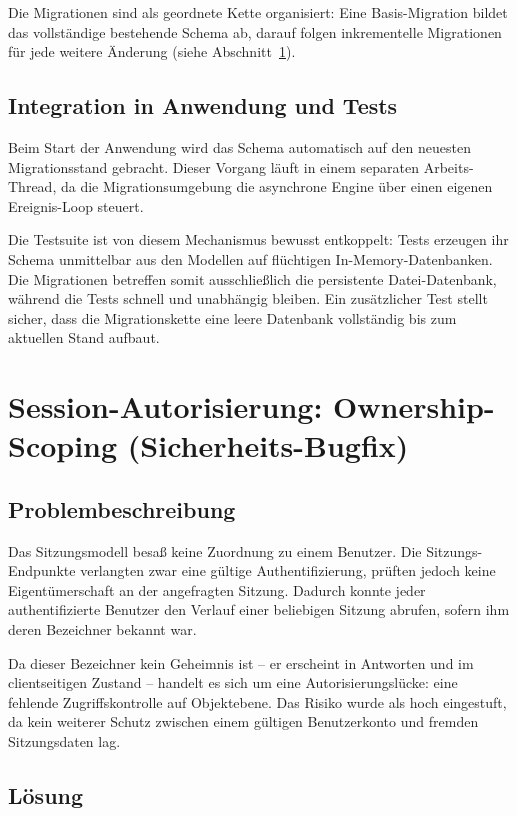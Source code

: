 \documentclass[11pt,a4paper]{article}
\begin{document}
Die Migrationen sind als geordnete Kette organisiert: Eine Basis-Migration bildet das
vollständige bestehende Schema ab, darauf folgen inkrementelle Migrationen für jede
weitere Änderung (siehe Abschnitt~\ref{sec:ownership}).

\subsection{Integration in Anwendung und Tests}

Beim Start der Anwendung wird das Schema automatisch auf den neuesten Migrationsstand
gebracht. Dieser Vorgang läuft in einem separaten Arbeits-Thread, da die
Migrationsumgebung die asynchrone Engine über einen eigenen Ereignis-Loop steuert.

Die Testsuite ist von diesem Mechanismus bewusst entkoppelt: Tests erzeugen ihr Schema
unmittelbar aus den Modellen auf flüchtigen In-Memory-Datenbanken. Die Migrationen
betreffen somit ausschließlich die persistente Datei-Datenbank, während die Tests
schnell und unabhängig bleiben. Ein zusätzlicher Test stellt sicher, dass die
Migrationskette eine leere Datenbank vollständig bis zum aktuellen Stand aufbaut.

\section{Session-Autorisierung: Ownership-Scoping (Sicherheits-Bugfix)}
\label{sec:ownership}

\subsection{Problembeschreibung}

Das Sitzungsmodell besaß keine Zuordnung zu einem Benutzer. Die Sitzungs-Endpunkte
verlangten zwar eine gültige Authentifizierung, prüften jedoch keine Eigentümerschaft
an der angefragten Sitzung. Dadurch konnte jeder authentifizierte Benutzer den Verlauf
einer beliebigen Sitzung abrufen, sofern ihm deren Bezeichner bekannt war.

Da dieser Bezeichner kein Geheimnis ist -- er erscheint in Antworten und im
clientseitigen Zustand -- handelt es sich um eine Autorisierungslücke: eine fehlende
Zugriffskontrolle auf Objektebene. Das Risiko wurde als hoch eingestuft, da kein
weiterer Schutz zwischen einem gültigen Benutzerkonto und fremden Sitzungsdaten lag.

\subsection{Lösung}
\end{document}
